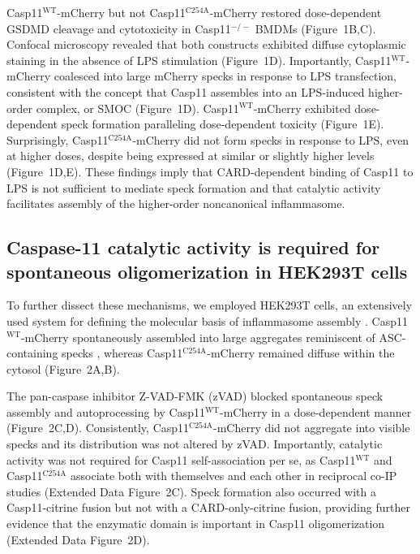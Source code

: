 \documentclass[11pt]{article}
\begin{document}
Casp11$^{\text{WT}}$-mCherry but not Casp11$^{\text{C254A}}$-mCherry restored dose-dependent GSDMD cleavage and cytotoxicity in Casp11$^{-/-}$ BMDMs (Figure~1B,C). Confocal microscopy revealed that both constructs exhibited diffuse cytoplasmic staining in the absence of LPS stimulation (Figure~1D). Importantly, Casp11$^{\text{WT}}$-mCherry coalesced into large mCherry specks in response to LPS transfection, consistent with the concept that Casp11 assembles into an LPS-induced higher-order complex, or SMOC (Figure~1D). Casp11$^{\text{WT}}$-mCherry exhibited dose-dependent speck formation paralleling dose-dependent toxicity (Figure~1E). Surprisingly, Casp11$^{\text{C254A}}$-mCherry did not form specks in response to LPS, even at higher doses, despite being expressed at similar or slightly higher levels (Figure~1D,E). These findings imply that CARD-dependent binding of Casp11 to LPS is not sufficient to mediate speck formation and that catalytic activity facilitates assembly of the higher-order noncanonical inflammasome.

\subsection{Caspase-11 catalytic activity is required for spontaneous oligomerization in HEK293T cells}

To further dissect these mechanisms, we employed HEK293T cells, an extensively used system for defining the molecular basis of inflammasome assembly \citep{kayagaki2015,rauch2017,shi2014,tenthorey2014}. Casp11$^{\text{WT}}$-mCherry spontaneously assembled into large aggregates reminiscent of ASC-containing specks \citep{stutz2013,tzeng2016}, whereas Casp11$^{\text{C254A}}$-mCherry remained diffuse within the cytosol (Figure~2A,B).

The pan-caspase inhibitor Z-VAD-FMK (zVAD) blocked spontaneous speck assembly and autoprocessing by Casp11$^{\text{WT}}$-mCherry in a dose-dependent manner (Figure~2C,D). Consistently, Casp11$^{\text{C254A}}$-mCherry did not aggregate into visible specks and its distribution was not altered by zVAD. Importantly, catalytic activity was not required for Casp11 self-association per se, as Casp11$^{\text{WT}}$ and Casp11$^{\text{C254A}}$ associate both with themselves and each other in reciprocal co-IP studies (Extended Data Figure~2C). Speck formation also occurred with a Casp11-citrine fusion but not with a CARD-only-citrine fusion, providing further evidence that the enzymatic domain is important in Casp11 oligomerization (Extended Data Figure~2D).
\end{document}
